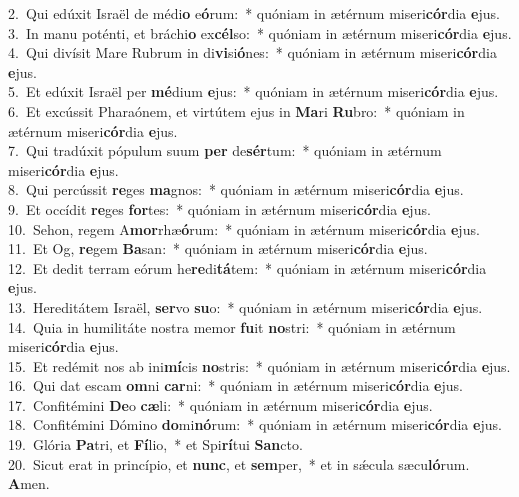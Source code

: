 {2.~}Qui edúxit Israël de médi\textbf{o} e\textbf{ó}rum:~* quóniam in ætérnum miseri\textbf{cór}dia \textbf{e}jus.\\
{3.~}In manu poténti, et bráchi\textbf{o} ex\textbf{cél}so:~* quóniam in ætérnum miseri\textbf{cór}dia \textbf{e}jus.\\
{4.~}Qui divísit Mare Rubrum in di\textbf{vi}si\textbf{ó}nes:~* quóniam in ætérnum miseri\textbf{cór}dia \textbf{e}jus.\\
{5.~}Et edúxit Israël per \textbf{mé}dium \textbf{e}jus:~* quóniam in ætérnum miseri\textbf{cór}dia \textbf{e}jus.\\
{6.~}Et excússit Pharaónem, et virtútem ejus in \textbf{Ma}ri \textbf{Ru}bro:~* quóniam in ætérnum miseri\textbf{cór}dia \textbf{e}jus.\\
{7.~}Qui tradúxit pópulum suum \textbf{per} de\textbf{sér}tum:~* quóniam in ætérnum miseri\textbf{cór}dia \textbf{e}jus.\\
{8.~}Qui percússit \textbf{re}ges \textbf{ma}gnos:~* quóniam in ætérnum miseri\textbf{cór}dia \textbf{e}jus.\\
{9.~}Et occídit \textbf{re}ges \textbf{for}tes:~* quóniam in ætérnum miseri\textbf{cór}dia \textbf{e}jus.\\
{10.~}Sehon, regem A\textbf{mor}rhæ\textbf{ó}rum:~* quóniam in ætérnum miseri\textbf{cór}dia \textbf{e}jus.\\
{11.~}Et Og, \textbf{re}gem \textbf{Ba}san:~* quóniam in ætérnum miseri\textbf{cór}dia \textbf{e}jus.\\
{12.~}Et dedit terram eórum he\textbf{re}di\textbf{tá}tem:~* quóniam in ætérnum miseri\textbf{cór}dia \textbf{e}jus.\\
{13.~}Hereditátem Israël, \textbf{ser}vo \textbf{su}o:~* quóniam in ætérnum miseri\textbf{cór}dia \textbf{e}jus.\\
{14.~}Quia in humilitáte nostra memor \textbf{fu}it \textbf{no}stri:~* quóniam in ætérnum miseri\textbf{cór}dia \textbf{e}jus.\\
{15.~}Et redémit nos ab ini\textbf{mí}cis \textbf{no}stris:~* quóniam in ætérnum miseri\textbf{cór}dia \textbf{e}jus.\\
{16.~}Qui dat escam \textbf{om}ni \textbf{car}ni:~* quóniam in ætérnum miseri\textbf{cór}dia \textbf{e}jus.\\
{17.~}Confitémini \textbf{De}o \textbf{cæ}li:~* quóniam in ætérnum miseri\textbf{cór}dia \textbf{e}jus.\\
{18.~}Confitémini Dómino \textbf{do}mi\textbf{nó}rum:~* quóniam in ætérnum miseri\textbf{cór}dia \textbf{e}jus.\\
{19.~}Glória \textbf{Pa}tri, et \textbf{Fí}lio,~* et Spi\textbf{rí}tui \textbf{San}cto.\\
{20.~}Sicut erat in princípio, et \textbf{nunc}, et \textbf{sem}per,~* et in sǽcula sæcu\textbf{ló}rum. \textbf{A}men.\\

